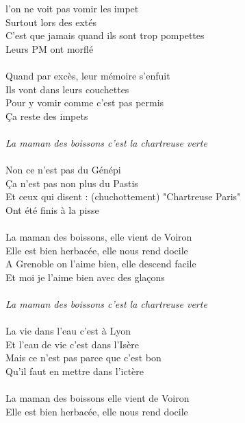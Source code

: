 %
 l'on ne voit pas vomir les impet 
\\Surtout lors des extés 
\\C'est que jamais quand ils sont trop pompettes
\\Leurs PM ont morflé
\\\\Quand par excès, leur mémoire s'enfuit
\\Ils vont dans leurs couchettes
\\Pour y vomir comme c'est pas permis
\\Ça reste des impets 
\\\\\textit{La maman des boissons c'est la chartreuse verte}
\\\\Non ce n'est pas du Génépi 
\\Ça n'est pas non plus du Pastis 
\\Et ceux qui disent : (chuchottement) "Chartreuse Paris"
\\Ont été finis à la pisse 
\\\\La maman des boissons, elle vient de Voiron 
\\Elle est bien herbacée, elle nous rend docile 
\\A Grenoble on l'aime bien, elle descend facile 
\\Et moi je l'aime bien avec des glaçons 
\\\\\textit{La maman des boissons c'est la chartreuse verte}
\\\\La vie dans l'eau c'est à Lyon 
\\Et l'eau de vie c'est dans l'Isère 
\\Mais ce n'est pas parce que c'est bon 
\\Qu'il faut en mettre dans l'ictère 
\\\\La maman des boissons elle vient de Voiron 
\\Elle est bien herbacée, elle nous rend docile 

